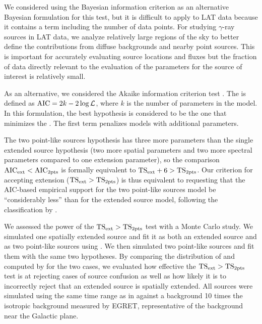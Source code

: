 We considered using the Bayesian information criterion
\citep[BIC,][]{schwarz_1978a_estimating-dimension} as an alternative
Bayesian formulation for this test, but it is difficult to apply to LAT
data because it contains a term including the number of data points.
For studying $\gamma$-ray sources in LAT data, we analyze relatively
large regions of the sky to better define the contributions from diffuse
backgrounds and nearby point sources. This is important for accurately
evaluating source locations and fluxes but the fraction of data directly
relevant to the evaluation of the parameters for the source of interest
is relatively small.

As an alternative, we considered the Akaike information criterion test
\citep[\aic,][]{akaike_1974a_statistical-model}.  The \aic is defined
as $\text{AIC}=2k-2\log\mathcal{L}$, where $k$ is the number of parameters
in the model.  In this formulation, the best hypothesis is considered
to be the one that minimizes the \aic.  The first term penalizes models
with additional parameters.

The two point-like sources hypothesis has three more parameters than
the single extended source hypothesis (two more spatial parameters and
two more spectral parameters compared to one extension parameter), so the
comparison $\text{AIC}_\text{ext} < \text{AIC}_\text{2pts}$  is formally equivalent to
$\mathrm{TS}_\mathrm{ext} + 6 > \mathrm{TS}_{\mathrm{2pts}}$.  Our criterion for accepting extension ($\mathrm{TS}_\mathrm{ext} >
\mathrm{TS}_{\mathrm{2pts}}$) is thus equivalent to requesting that the AIC-based empirical
support for the two point-like sources model be ``considerably less''
than for the extended source model, following the classification by
\cite{burnham_2002a_model-selection}.

We assessed the power of the $\mathrm{TS}_\mathrm{ext}>\mathrm{TS}_{\mathrm{2pts}}$ test with a Monte Carlo
study.  We simulated one spatially extended source and fit it as both
an extended source and as two point-like sources using \pointlike.
We then simulated two point-like sources and fit them with the same
two hypotheses. By comparing the distribution of \tsinc and \tsext
computed by \pointlike for the two cases, we evaluated how effective
the $\mathrm{TS}_\mathrm{ext}>\mathrm{TS}_{\mathrm{2pts}}$ test is at rejecting cases of source confusion as
well as how likely it is to incorrectly reject that an extended source is
spatially extended.  All sources were simulated using the same time range
as in  against a background 10 times the
isotropic background measured by EGRET, representative of the background
near the Galactic plane.

